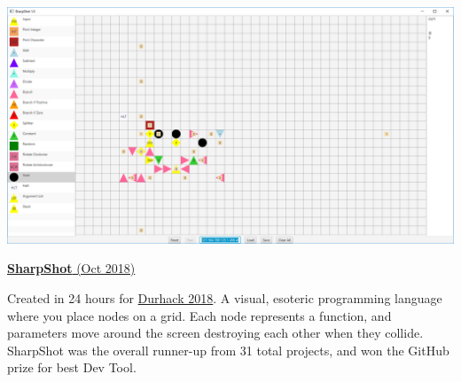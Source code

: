 \documentclass[hidelinks, 12pt, a4paper]{article}
\newcommand{\tech}[1]{
	\tcbox[skin=enhanced,nobeforeafter,colframe=black!20,size=fbox,height=15pt]{\footnotesize#1}
}
\begin{document}
\begin{minipage}{0.40\textwidth}
		\begin{center}
			\href{https://github.com/motherlymuppet/sharpshot}{\includegraphics[width=0.9\linewidth]{sharpshot.png}}
		\end{center}
		\vspace{-12pt}
		\href{https://github.com/motherlymuppet/sharpshot}{\textbf{SharpShot} (Oct 2018)}
		
		Created in 24 hours for \href{http://www.durhack.com}{Durhack 2018}. A visual, esoteric programming language where you place nodes on a grid. Each node represents a function, and parameters move around the screen destroying each other when they collide. SharpShot was the overall runner-up from 31 total projects, and won the GitHub prize for best Dev Tool.
		
		\tech{Java} \tech{Javafx}
		
	\end{minipage}
	\hspace{0.06\textwidth}
\end{document}

